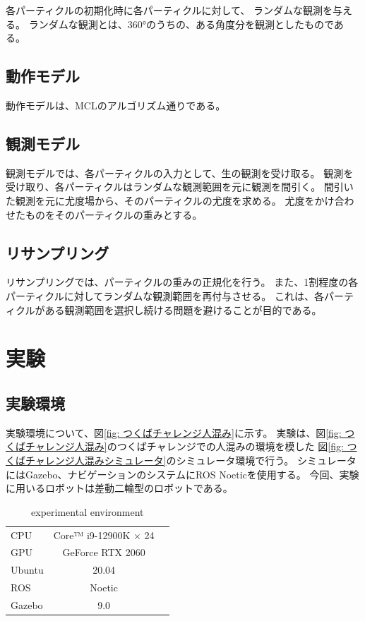 \documentclass{jarticle}
\begin{document}
各パーティクルの初期化時に各パーティクルに対して、
ランダムな観測を与える。
ランダムな観測とは、360°のうちの、ある角度分を観測としたものである。

\subsection{動作モデル}

動作モデルは、MCLのアルゴリズム通りである。

\subsection{観測モデル}

観測モデルでは、各パーティクルの入力として、生の観測を受け取る。
観測を受け取り、各パーティクルはランダムな観測範囲を元に観測を間引く。
間引いた観測を元に尤度場から、そのパーティクルの尤度を求める。
尤度をかけ合わせたものをそのパーティクルの重みとする。

\subsection{リサンプリング}

リサンプリングでは、パーティクルの重みの正規化を行う。
また、1割程度の各パーティクルに対してランダムな観測範囲を再付与させる。
これは、各パーティクルがある観測範囲を選択し続ける問題を避けることが目的である。

\section{実験}%

\subsection{実験環境}

実験環境について、図\ref{fig: つくばチャレンジ人混み}に示す。
実験は、図\ref{fig: つくばチャレンジ人混み}のつくばチャレンジでの人混みの環境を模した
図\ref{fig: つくばチャレンジ人混みシミュレータ}のシミュレータ環境で行う。
シミュレータにはGazebo、ナビゲーションのシステムにROS Noeticを使用する。
今回、実験に用いるロボットは差動二輪型のロボットである。

\begin{table}[hbtp]
  \caption{experimental environment}
  \label{table:data_type}
  \centering
  \begin{tabular}{lcr}
    \hline
    CPU & Core™ i9-12900K × 24 \\
    GPU & GeForce RTX 2060 \\
    Ubuntu & 20.04 \\
    ROS  & Noetic \\
    Gazebo  &  9.0 \\
    \hline
  \end{tabular}
\end{table}
\end{document}
